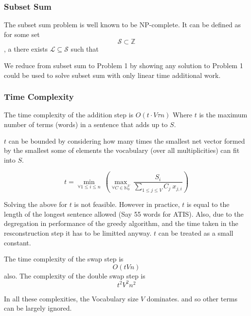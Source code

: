 \documentclass[]{scrartcl}
\begin{document}
\subsubsection{Subset Sum}
The subset sum problem is well known to be NP-complete.
It can be defined as for some set $$\mathcal{S}\subset\mathbb{Z}$$, a there exists  $\mathcal{L}\subseteq\mathcal{S}$ such that 


We reduce from subset sum to Problem 1 by showing any solution to Problem 1 could be used to solve subset sum with only linear time additional work.





\subsubsection{Time Complexity}
The time complexity of the addition step is $O(t \cdot V\tau n)$
Where $t$ is the maximum number of terms (words) in a sentence that adds up to $S$.

$t$ can be bounded by considering how many times the smallest net vector formed by the smallest some of elements the vocabulary (over all multiplicities) can fit into $S$.

$$t = \min_{\forall 1 \le i \le n}\: \left(\max_{\forall C \in \mathbb{N}_0^V}\: \frac{S_i}{\sum_{1\le j \le V} C_j\: x_{j,i}} \right)$$

Solving the above for $t$ is not feasible. However in practice, $t$ is equal to the length of the longest sentence allowed (Say 55 words for ATIS). Also, due to the degregation in performance of the greedy algorithm, and the time taken in the resconstruction step it has to be limitted anyway. $t$ can be treated as a small constant.

The time complexity of the swap step is $$O(tVn)$$ also.
The complexity of the double swap step is $$t^2 V^2 n^2$$

In all these complexities, the Vocabulary size $V$ dominates. and so other terms can be largely ignored.
\end{document}

